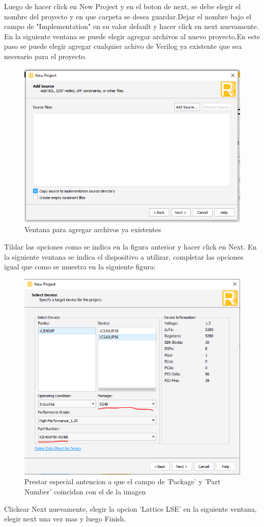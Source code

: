 \documentclass{article}
\begin{document}
	Luego de hacer click en New Project y en el boton de next, se debe elegir el nombre del proyecto y en que carpeta se desea guardar.Dejar el nombre bajo el campo de "Implementation" en su valor default y hacer click en next nuevamente.
	En la siguiente ventana se puede elegir agregar archivos al nuevo proyecto.En este paso se puede elegir agregar cualquier achivo de Verilog ya existente que sea necesario para el proyecto.
	\begin{figure}[H]
	\includegraphics[width=\textwidth]{Imagenes/AddSources.png}
	\caption{Ventana para agregar archivos ya existentes}
	\end{figure}
	
	Tildar las opciones como se indica en la figura anterior y hacer click en Next.
	En la siguiente ventana se indica el dispositivo a utilizar, completar las opciones igual que como se muestra en la siguiente figura:
	\begin{figure}[H]
	\includegraphics[width=\textwidth]{Imagenes/Dispositivo.png}
	\caption{Prestar especial antencion a que el campo de 'Package' y 'Part Number' coincidan con el de la imagen }
	\end{figure}
	Clickear Next nuevamente, elegir la opcion 'Lattice LSE' en la siguiente ventana, elegir next una vez mas y luego Finish.
	
\end{document}
